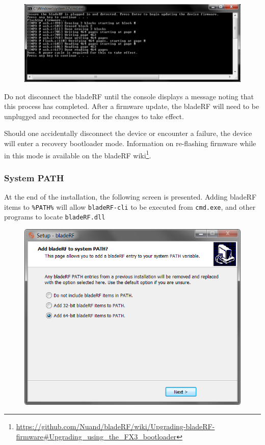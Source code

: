 {\begin{figure}[h]
  \centering
  \includegraphics[width=6in]{images/windows/installer/09-fwupdate.png}
\end{figure}

Do not disconnect the bladeRF until the console displays a message
noting that this process has completed. After a firmware update, the bladeRF
will need to be unplugged and reconnected for the changes to take effect.

Should one accidentally disconnect the device or encounter a failure, the
device will enter a recovery bootloader mode. Information on re-flashing
firmware while in this mode is available on the bladeRF wiki\footnote{\url{https://github.com/Nuand/bladeRF/wiki/Upgrading-bladeRF-firmware\#Upgrading\_using\_the\_FX3\_bootloader}}.

\newpage
\subsubsection{System PATH}

At the end of the installation, the following screen is presented.
Adding bladeRF items to \texttt{\%PATH\%} will allow \texttt{bladeRF-cli}
to be executed from \texttt{cmd.exe}, and other programs to locate \texttt{bladeRF.dll}

\begin{figure}[h]
  \centering
  \includegraphics{images/windows/installer/10-systempath.png}
\end{figure}


}
